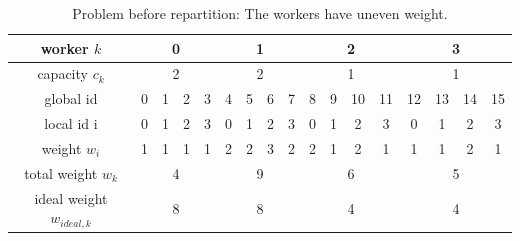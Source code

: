 \begin{table}[H]
	\begin{center}
		\begin{tabular}{ | c | c | c | c | c | c | c | c | c | c | c | c | c | c | c | c | c | } 
			\hline
			worker $k$ & \multicolumn{4}{c|}{\cellcolor{vs_lightgreen}0} & \multicolumn{4}{c|}{\cellcolor{vs_lightblue}1} & \multicolumn{4}{c|}{\cellcolor{vs_lightred}2} & \multicolumn{4}{c|}{\cellcolor{vs_lightplum}3}  \\
			\hline
			capacity $c_k$ & \multicolumn{4}{c|}{\cellcolor{vs_lightgreen}2} & \multicolumn{4}{c|}{\cellcolor{vs_lightblue}2} & \multicolumn{4}{c|}{\cellcolor{vs_lightred}1} & \multicolumn{4}{c|}{\cellcolor{vs_lightplum}1}  \\
			\hline
			global id & \cellcolor{vs_lightgreen}0 & \cellcolor{vs_lightgreen}1 & \cellcolor{vs_lightgreen}2 & \cellcolor{vs_lightgreen}3 & \cellcolor{vs_lightblue}4 & \cellcolor{vs_lightblue}5 & \cellcolor{vs_lightblue}6 & \cellcolor{vs_lightblue}7 & \cellcolor{vs_lightred}8 & \cellcolor{vs_lightred}9 & \cellcolor{vs_lightred}10 & \cellcolor{vs_lightred}11 & \cellcolor{vs_lightplum}12 & \cellcolor{vs_lightplum}13 & \cellcolor{vs_lightplum}14 & \cellcolor{vs_lightplum}15 \\ 
			\hline
			local id i & \cellcolor{vs_lightgreen}0 & \cellcolor{vs_lightgreen}1 & \cellcolor{vs_lightgreen}2 & \cellcolor{vs_lightgreen}3 & \cellcolor{vs_lightblue}0 & \cellcolor{vs_lightblue}1 & \cellcolor{vs_lightblue}2 & \cellcolor{vs_lightblue}3 & \cellcolor{vs_lightred}0 & \cellcolor{vs_lightred}1 & \cellcolor{vs_lightred}2 & \cellcolor{vs_lightred}3 & \cellcolor{vs_lightplum}0 & \cellcolor{vs_lightplum}1 & \cellcolor{vs_lightplum}2 & \cellcolor{vs_lightplum}3 \\ 
			\hline
			weight $w_i$ & \cellcolor{vs_lightgreen}1 & \cellcolor{vs_lightgreen}1 & \cellcolor{vs_lightgreen}1 & \cellcolor{vs_lightgreen}1 & \cellcolor{vs_lightblue}2 & \cellcolor{vs_lightblue}2 & \cellcolor{vs_lightblue}3 & \cellcolor{vs_lightblue}2 & \cellcolor{vs_lightred}2 & \cellcolor{vs_lightred}1 & \cellcolor{vs_lightred}2 & \cellcolor{vs_lightred}1 & \cellcolor{vs_lightplum}1 & \cellcolor{vs_lightplum}1 & \cellcolor{vs_lightplum}2 & \cellcolor{vs_lightplum}1 \\ 
			\hline
			total weight $w_k$ & \multicolumn{4}{c|}{\cellcolor{vs_lightgreen}4} & \multicolumn{4}{c|}{\cellcolor{vs_lightblue}9} & \multicolumn{4}{c|}{\cellcolor{vs_lightred}6} & \multicolumn{4}{c|}{\cellcolor{vs_lightplum}5} \\ 
			\hline
			ideal weight $w_{ideal,k}$ & \multicolumn{4}{c|}{\cellcolor{vs_lightgreen}8} & \multicolumn{4}{c|}{\cellcolor{vs_lightblue}8} & \multicolumn{4}{c|}{\cellcolor{vs_lightred}4} & \multicolumn{4}{c|}{\cellcolor{vs_lightplum}4} \\ 
			\hline
		\end{tabular}
	
		\caption{Problem before repartition: The workers have uneven weight.}
		\label{table:before_repartition}
	\end{center}
\end{table}

